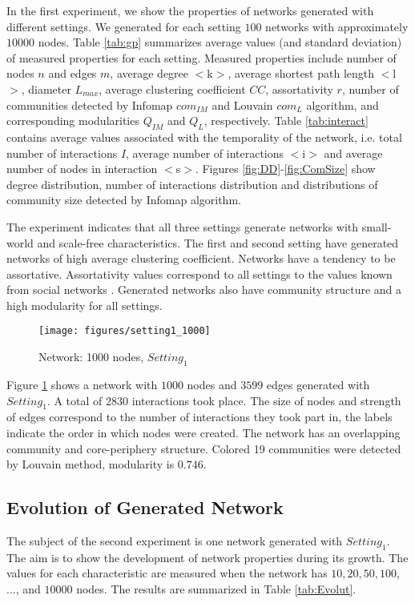 In the first experiment, we show the properties of networks generated with different settings. We generated for each setting $100$ networks with approximately $10000$ nodes. Table \ref{tab:gp} summarizes average values (and standard deviation) of measured properties for each setting. Measured properties include number of nodes $n$ and edges $m$, average degree $<$k$>$, average shortest path length $<$l$>$, diameter $L_{max}$, average clustering coefficient $CC$, assortativity $r$, number of communities detected by Infomap \cite{rosvall2009map} $com_{IM}$ and Louvain \cite{blondel2008fast} $com_L$ algorithm, and corresponding modularities $Q_{IM}$ and $Q_L$, respectively. Table \ref{tab:interact} contains average values associated with the temporality of the network, i.e. total number of interactions $I$, average number of interactions $<$i$>$ and average number of nodes in interaction $<$s$>$. Figures \ref{fig:DD}-\ref{fig:ComSize} show degree distribution, number of interactions distribution and distributions of community size detected by Infomap algorithm.

The experiment indicates that all three settings generate networks with small-world and scale-free characteristics. The first and second setting have generated networks of high average clustering coefficient. Networks have a tendency to be assortative. Assortativity values correspond to all settings to the values known from social networks \cite{newman2002assortative}. Generated networks also have community structure and a high modularity for all settings.

\begin{figure}[ht]
\centering
\texttt{[image: figures/setting1\_1000]}
  \caption{Network: 1000 nodes, $Setting_1$}
	\label{fig:Set1000}
\end{figure}

Figure \ref{fig:Set1000} shows a network with $1000$ nodes and $3599$ edges generated with $Setting_1$. A total of $2830$ interactions took place. The size of nodes and strength of edges correspond to the number of interactions they took part in, the labels indicate the order in which nodes were created. The network has an overlapping community and core-periphery structure. Colored 19 communities were detected by Louvain method, modularity is $0.746$.

\subsection{Evolution of Generated Network}
The subject of the second experiment is one network generated with $Setting_1$. The aim is to show the development of network properties during its growth. The values for each characteristic are measured when the network has $10, 20, 50, 100$, ..., and $10000$ nodes. The results are summarized in Table \ref{tab:Evolut}.

